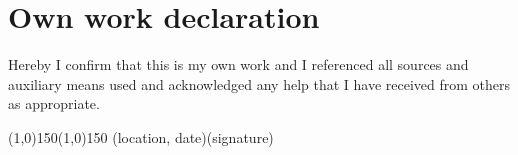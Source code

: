 \cleardoublepage
\section*{Own work declaration}
  Hereby I confirm that this is my own work and I referenced all sources and
  auxiliary means used and acknowledged any help that I have received from
  others as appropriate.

\vspace*{30mm}
\hspace{-6mm}\line(1,0){150}\hspace{44mm}\line(1,0){150}
\newline
(location, date)\hspace{72mm}(signature)

\cleardoublepage
%

\cleardoublepage
